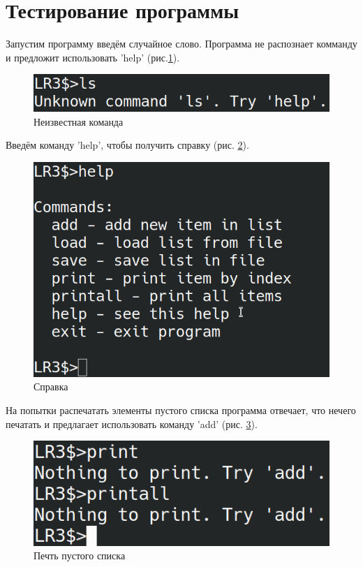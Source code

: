 \section*{Тестирование программы}

Запустим программу введём случайное слово. 
Программа не распознает комманду и предложит 
использовать 'help' (рис.\ref{test.unknown_command}). 

\begin{figure}[hpt!]
    \centering
    \includegraphics[width=0.9\linewidth]{photo/test.unknown_command}
    \caption{Неизвестная команда}
    \label{test.unknown_command}
\end{figure}

Введём команду 'help', чтобы получить справку (рис. \ref{test.help}).

\begin{figure}[hpt!]
    \centering
    \includegraphics[width=0.9\linewidth]{photo/test.help}
    \caption{Справка}
    \label{test.help}
\end{figure}

На попытки распечатать элементы пустого списка
программа отвечает, что нечего печатать и предлагает
использовать команду 'add' (рис. \ref{test.print_empty}).

\begin{figure}[H]
    \centering
    \includegraphics[width=0.9\linewidth]{photo/test.print_empty}
    \caption{Печть пустого списка}
    \label{test.print_empty}
\end{figure}

